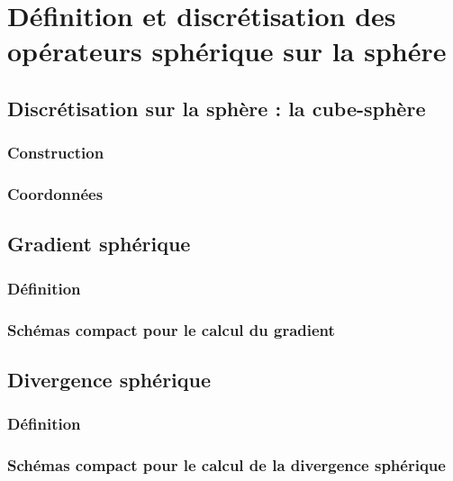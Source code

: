 
\chapter{Définition et discrétisation des opérateurs sphérique sur la sphére}

\section{Discrétisation sur la sphère : la cube-sphère}

\subsection{Construction}

\subsection{Coordonnées}

\section{Gradient sphérique}

\subsection{Définition}

\subsection{Schémas compact pour le calcul du gradient}

\section{Divergence sphérique}

\subsection{Définition}

\subsection{Schémas compact pour le calcul de la divergence sphérique}